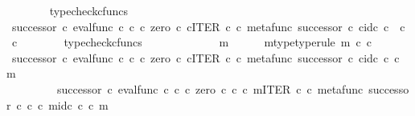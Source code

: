 \begin{isabellebody}
\ \ \ \ \ \ \isamarkupfalse%
\ typecheck{\isacharunderscore}{\kern0pt}cfuncs\isanewline
\ \ \ \ \isamarkupfalse%
\ {\isachardoublequoteopen}successor\ {\isasymcirc}\isactrlsub c\ eval{\isacharunderscore}{\kern0pt}func\ {\isasymnat}\isactrlsub c\ {\isasymnat}\isactrlsub c\ {\isasymcirc}\isactrlsub c\ {\isasymlangle}zero\ {\isasymcirc}\isactrlsub c\ {\isasymbeta}\isactrlbsub {\isasymnat}\isactrlsub c\isactrlesub {\isacharcomma}{\kern0pt}ITER\ {\isasymnat}\isactrlsub c\ {\isasymcirc}\isactrlsub c\ {\isasymlangle}metafunc\ successor\ {\isasymcirc}\isactrlsub c\ {\isasymbeta}\isactrlbsub {\isasymnat}\isactrlsub c\isactrlesub {\isacharcomma}{\kern0pt}id\isactrlsub c\ {\isasymnat}\isactrlsub c{\isasymrangle}{\isasymrangle}\ {\isacharcolon}{\kern0pt}\ {\isasymnat}\isactrlsub c\ {\isasymrightarrow}\ {\isasymnat}\isactrlsub c{\isachardoublequoteclose}\isanewline
\ \ \ \ \ \ \isamarkupfalse%
\ typecheck{\isacharunderscore}{\kern0pt}cfuncs\isanewline
\ \ \isamarkupfalse%
\ \ \ \ \isanewline
\ \ \ \ \isamarkupfalse%
\ m\isanewline
\ \ \ \ \isamarkupfalse%
\ m{\isacharunderscore}{\kern0pt}type{\isacharbrackleft}{\kern0pt}type{\isacharunderscore}{\kern0pt}rule{\isacharbrackright}{\kern0pt}{\isacharcolon}{\kern0pt}\ {\isachardoublequoteopen}m\ {\isasymin}\isactrlsub c\ {\isasymnat}\isactrlsub c{\isachardoublequoteclose}\isanewline
\ \ \ \ \isamarkupfalse%
\ {\isachardoublequoteopen}{\isacharparenleft}{\kern0pt}successor\ {\isasymcirc}\isactrlsub c\ eval{\isacharunderscore}{\kern0pt}func\ {\isasymnat}\isactrlsub c\ {\isasymnat}\isactrlsub c\ {\isasymcirc}\isactrlsub c\ {\isasymlangle}zero\ {\isasymcirc}\isactrlsub c\ {\isasymbeta}\isactrlbsub {\isasymnat}\isactrlsub c\isactrlesub {\isacharcomma}{\kern0pt}ITER\ {\isasymnat}\isactrlsub c\ {\isasymcirc}\isactrlsub c\ {\isasymlangle}metafunc\ successor\ {\isasymcirc}\isactrlsub c\ {\isasymbeta}\isactrlbsub {\isasymnat}\isactrlsub c\isactrlesub {\isacharcomma}{\kern0pt}id\isactrlsub c\ {\isasymnat}\isactrlsub c{\isasymrangle}{\isasymrangle}{\isacharparenright}{\kern0pt}\ {\isasymcirc}\isactrlsub c\ m\ {\isacharequal}{\kern0pt}\ \isanewline
\ \ \ \ \ \ \ \ \ successor\ {\isasymcirc}\isactrlsub c\ eval{\isacharunderscore}{\kern0pt}func\ {\isasymnat}\isactrlsub c\ {\isasymnat}\isactrlsub c\ {\isasymcirc}\isactrlsub c\ {\isasymlangle}zero\ {\isasymcirc}\isactrlsub c\ {\isasymbeta}\isactrlbsub {\isasymnat}\isactrlsub c\isactrlesub \ {\isasymcirc}\isactrlsub c\ m{\isacharcomma}{\kern0pt}ITER\ {\isasymnat}\isactrlsub c\ {\isasymcirc}\isactrlsub c\ {\isasymlangle}metafunc\ successor\ {\isasymcirc}\isactrlsub c\ {\isasymbeta}\isactrlbsub {\isasymnat}\isactrlsub c\isactrlesub \ {\isasymcirc}\isactrlsub c\ m{\isacharcomma}{\kern0pt}id\isactrlsub c\ {\isasymnat}\isactrlsub c\ {\isasymcirc}\isactrlsub c\ m{\isasymrangle}{\isasymrangle}{\isachardoublequoteclose}\isanewline

\end{isabellebody}
